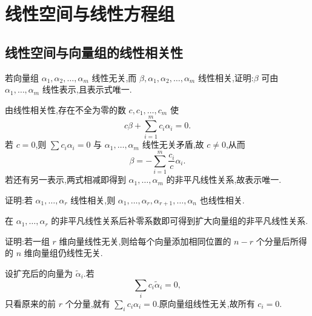 \setcounter{chapter}{3}
\pagestyle{fancy}

\chapter{线性空间与线性方程组}

\section{线性空间与向量组的线性相关性}

\begin{example}[\markstar]
若向量组 $\alpha_1,\alpha_2,\ldots,\alpha_m$ 线性无关,而
$\beta,\alpha_1,\alpha_2,\ldots,\alpha_m$ 线性相关,证明:$\beta$ 可由
$\alpha_1,\ldots,\alpha_m$ 线性表示,且表示式唯一.
\end{example}
\exampleblank

\begin{solution}
由线性相关性,存在不全为零的数 $c,c_1,\ldots,c_m$ 使
\[
 c\beta+\sum\limits_{i=1}^m c_i\alpha_i=0.
\]
若 $c=0$,则 $\displaystyle\sum c_i\alpha_i=0$ 与 $\alpha_1,\ldots,\alpha_m$ 线性无关矛盾,故 $c\neq0$,从而
\[
 \beta=-\sum\limits_{i=1}^m\dfrac{c_i}{c}\alpha_i.
\]
若还有另一表示,两式相减即得到 $\alpha_1,\ldots,\alpha_m$ 的非平凡线性关系,故表示唯一.
\end{solution}

\begin{example}[\markstar]
证明:若 $\alpha_1,\ldots,\alpha_r$ 线性相关,则
$\alpha_1,\ldots,\alpha_r,\alpha_{r+1},\ldots,\alpha_n$ 也线性相关.
\end{example}
\exampleblank

\begin{solution}
在 $\alpha_1,\ldots,\alpha_r$ 的非平凡线性关系后补零系数即可得到扩大向量组的非平凡线性关系.
\end{solution}

\begin{example}[\markstar]
证明:若一组 $r$ 维向量线性无关,则给每个向量添加相同位置的 $n-r$ 个分量后所得的 $n$ 维向量组仍线性无关.
\end{example}
\exampleblank

\begin{solution}
设扩充后的向量为 $\widetilde\alpha_i$.若
\[
 \displaystyle\sum_i c_i\widetilde\alpha_i=0,
\]
只看原来的前 $r$ 个分量,就有 $\displaystyle\sum_i c_i\alpha_i=0$.原向量组线性无关,故所有 $c_i=0$.
\end{solution}

